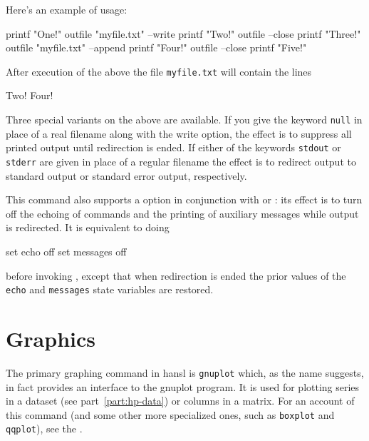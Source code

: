 Here's an example of usage:
\begin{code}
  printf "One!\n"
  outfile "myfile.txt" --write
  printf "Two!\n"
  outfile --close
  printf "Three!\n"
  outfile "myfile.txt" --append
  printf "Four!\n"
  outfile --close
  printf "Five!\n"
\end{code}
After execution of the above the file \texttt{myfile.txt} will contain
the lines
\begin{code}
Two!
Four!  
\end{code}

Three special variants on the above are available. If you give the
keyword \texttt{null} in place of a real filename along with the write
option, the effect is to suppress all printed output until redirection
is ended. If either of the keywords \texttt{stdout} or \texttt{stderr}
are given in place of a regular filename the effect is to redirect
output to standard output or standard error output, respectively.

This command also supports a  option in conjunction with
 or : its effect is to turn off the
echoing of commands and the printing of auxiliary messages while
output is redirected. It is equivalent to doing
\begin{code}
  set echo off 
  set messages off
\end{code}
before invoking , except that when redirection is ended
the prior values of the \texttt{echo} and \texttt{messages} state
variables are restored.

\section{Graphics}

The primary graphing command in hansl is \texttt{gnuplot} which, as
the name suggests, in fact provides an interface to the
\textsf{gnuplot} program. It is used for plotting series in a dataset
(see part~\ref{part:hp-data}) or columns in a matrix. For an account
of this command (and some other more specialized ones, such as
\texttt{boxplot} and \texttt{qqplot}), see the \GCR.

